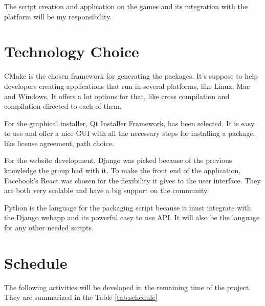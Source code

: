 The script creation and application on the games and its integration with the platform will be my responsibility.


\section[Technology Choice]{Technology Choice}

CMake is the chosen framework for generating the packages. It's suppose to help developers creating applications that run in several platforms, like Linux, Mac and Windows. It offers a lot options for that, like cross compilation and compilation directed to each of them.

For the graphical installer, Qt Installer Framework, has been selected. It is easy to use and offer a nice GUI with all the necessary steps for installing a package, like license agreement, path choice.

For the website development, Django  was picked because of the previous knowledge the group had with it. To make the front end of the application, Facebook's React was chosen for the flexibility it gives to the user interface. They are both very scalable and have a big support on the community.

Python is the language for the packaging script because it must integrate with the Django webapp and its powerful easy to use API. It will also be the language for any other needed scripts.


\section[Schedule]{Schedule}

The following activities will be developed in the remaining time of the project. They are summarized in the Table \ref{tab:schedule}


